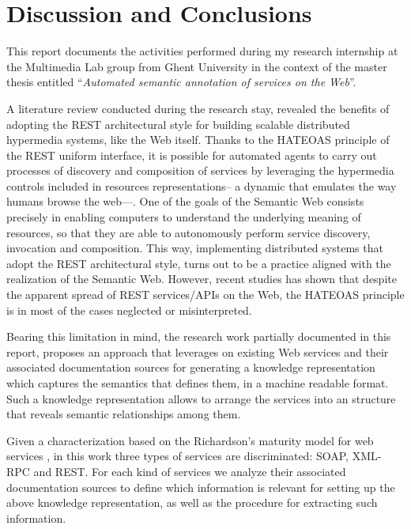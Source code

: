 \section{Discussion and Conclusions}
\label{sec:discussion_conclusions}

\noindent This report documents the activities performed during my research internship at the Multimedia Lab group from Ghent University in the context of the master thesis entitled \textquotedblleft{}\emph{Automated semantic annotation of services on the Web}\textquotedblright{}.

A literature review conducted during the research stay, revealed the benefits of adopting the REST architectural style for building scalable distributed hypermedia systems, like the Web itself. Thanks to the HATEOAS principle of the REST uniform interface, it is possible for automated agents to carry out processes of discovery and composition of services by leveraging the hypermedia controls included in resources representations-- a dynamic that emulates the way humans browse the web---. One of the goals of the Semantic Web consists precisely in enabling computers to understand the underlying meaning of resources, so that they are able to autonomously perform service discovery, invocation and composition. This way, implementing distributed systems that adopt the REST architectural style, turns out to be a practice aligned with the realization of the Semantic Web. However, recent studies has shown that despite the apparent spread of REST services/APIs on the Web, the HATEOAS principle is in most of the cases neglected or misinterpreted.

Bearing this limitation in mind, the research work partially documented in this report, proposes an approach that leverages on existing Web services and their associated documentation sources for generating a knowledge representation which captures the semantics that defines them, in a machine readable format. Such a knowledge representation allows to arrange the services into an structure that reveals semantic relationships among them.

Given a characterization based on the Richardson's maturity model for web services \cite{Richardson:2008}, in this work three types of services are discriminated: SOAP, XML-RPC and REST. For each kind of services we analyze their associated documentation sources to define which information is relevant for setting up the above knowledge representation, as well as the procedure for extracting such information.

